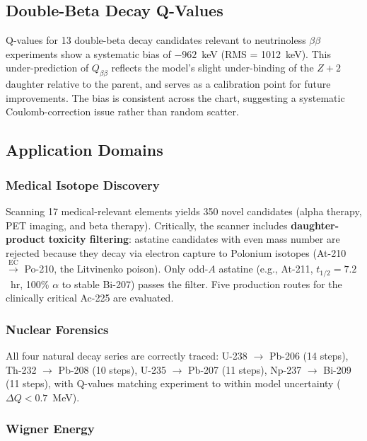 \documentclass[twocolumn,letterpaper,10pt]{article}
\begin{document}
\subsection{Double-Beta Decay Q-Values}

Q-values for 13 double-beta decay candidates relevant to neutrinoless
$\beta\beta$ experiments show a systematic bias of $-962$~keV (RMS =
1012~keV). This under-prediction of $Q_{\beta\beta}$ reflects the model's
slight under-binding of the $Z{+}2$ daughter relative to the parent, and
serves as a calibration point for future improvements. The bias is
consistent across the chart, suggesting a systematic Coulomb-correction
issue rather than random scatter.

\subsection{Application Domains}

\subsubsection{Medical Isotope Discovery}

Scanning 17 medical-relevant elements yields 350 novel candidates (alpha
therapy, PET imaging, and beta therapy). Critically, the scanner includes
\textbf{daughter-product toxicity filtering}: astatine candidates with even
mass number are rejected because they decay via electron capture to Polonium
isotopes (At-210 $\xrightarrow{\text{EC}}$ Po-210, the Litvinenko poison).
Only odd-$A$ astatine (e.g., At-211, $t_{1/2} = 7.2$~hr, 100\% $\alpha$
to stable Bi-207) passes the filter. Five production routes for the
clinically critical Ac-225 are evaluated.

\subsubsection{Nuclear Forensics}

All four natural decay series are correctly traced: U-238 $\to$ Pb-206 (14
steps), Th-232 $\to$ Pb-208 (10 steps), U-235 $\to$ Pb-207 (11 steps),
Np-237 $\to$ Bi-209 (11 steps), with Q-values matching experiment to
within model uncertainty ($\Delta Q < 0.7$~MeV).

\subsubsection{Wigner Energy}
\end{document}
